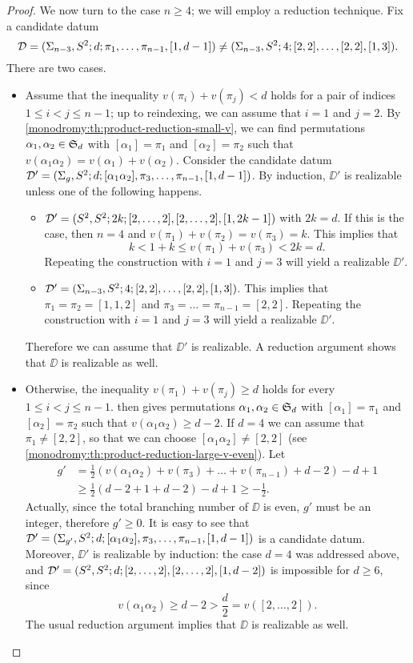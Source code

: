 \begin{proof}
We now turn to the case $n\ge 4$; we will employ a reduction technique. Fix a candidate datum
\[
\mathcal{D}=(\Sigma_{n-3},S^2{};d;\pi_1,\ldots,\pi_{n-1},[1,d-1])\neq(\Sigma_{n-3},S^2{};4;[2,2],\ldots,[2,2],[1,3]).
\]
There are two cases.
\begin{itemize}
\item Assume that the inequality $v(\pi_i)+v(\pi_j)<d$ holds for a pair of indices $1\le i<j\le n-1$; up to reindexing, we can assume that $i=1$ and $j=2$. By \cref{monodromy:th:product-reduction-small-v}, we can find permutations $\alpha_1,\alpha_2\in\symgroup[d]$ with $[\alpha_1]=\pi_1$ and $[\alpha_2]=\pi_2$ such that $v(\alpha_1\alpha_2)=v(\alpha_1)+v(\alpha_2)$. Consider the candidate datum $\mathcal{D}'=(\Sigma_{g},S^2{};d;[\alpha_1\alpha_2],\pi_3,\ldots,\pi_{n-1},[1,d-1])$. By induction, $\DD'$ is realizable unless one of the following happens.
\begin{itemize}
\item $\mathcal{D}'=(S^2{},S^2{};2k;[2,\ldots,2],[2,\ldots,2],[1,2k-1])$ with $2k=d$. If this is the case, then $n=4$ and $v(\pi_1)+v(\pi_2)=v(\pi_3)=k$. This implies that
\[
k<1+k\le v(\pi_1)+v(\pi_3)<2k=d.
\]
Repeating the construction with $i=1$ and $j=3$ will yield a realizable $\DD'$.
\item $\mathcal{D}'=(\Sigma_{n-3},S^2{};4;[2,2],\ldots,[2,2],[1,3])$. This implies that $\pi_1=\pi_2=[1,1,2]$ and $\pi_3=\ldots=\pi_{n-1}=[2,2]$. Repeating the construction with $i=1$ and $j=3$ will yield a realizable $\DD'$.
\end{itemize}
Therefore we can assume that $\DD'$ is realizable. A reduction argument shows that $\DD$ is realizable as well.
\item Otherwise, the inequality $v(\pi_1)+v(\pi_j)\ge d$ holds for every $1\le i<j\le n-1$.  then gives permutations $\alpha_1,\alpha_2\in\symgroup[d]$ with $[\alpha_1]=\pi_1$ and $[\alpha_2]=\pi_2$ such that $v(\alpha_1\alpha_2)\ge d-2$. If $d=4$ we can assume that $\pi_1\neq[2,2]$, so that  we can choose $[\alpha_1\alpha_2]\neq[2,2]$ (see \cref{monodromy:th:product-reduction-large-v-even}). Let
\begin{align*}
g'&=\frac{1}{2}(v(\alpha_1\alpha_2)+v(\pi_3)+\ldots+v(\pi_{n-1})+d-2)-d+1\\
&\ge \frac{1}{2}(d-2+1+d-2)-d+1\ge-\frac{1}{2}.
\end{align*}
Actually, since the total branching number of $\DD$ is even, $g'$ must be an integer, therefore $g'\ge 0$. It is easy to see that $\mathcal{D}'=(\Sigma_{g'},S^2{};d;[\alpha_1\alpha_2],\pi_3,\ldots,\pi_{n-1},[1,d-1])$ is a candidate datum. Moreover, $\DD'$ is realizable by induction: the case $d=4$ was addressed above, and $\mathcal{D}'=(S^2{},S^2{};d;[2,\ldots,2],[2,\ldots,2],[1,d-2])$ is impossible  for $d\ge 6$, since
\[
v(\alpha_1\alpha_2)\ge d-2>\frac{d}{2}=v([2,\ldots,2]).
\]
The usual reduction argument implies that $\DD$ is realizable as well.\qedhere
\end{itemize}
\end{proof}


